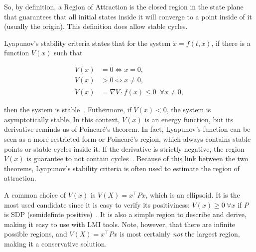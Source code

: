 So, by definition, a Region of Attraction is the closed region in the state
plane that guarantees that all initial states inside it will converge to a point
inside of it (usually the origin). This definition does allow stable cycles.

Lyapunov's stability criteria states that for the system \(\dot{x} = f(t, x)\),
if there is a function \(V(x)\) such that

\begin{align}
  V(x)       & = 0 \iff x = 0,                                           \\
  V(x)       & > 0 \iff x \ne 0,                                         \\
  \dot{V}(x) & = \nabla{}V\cdot{}f(x) \le 0 \phantom{0} \forall x \ne 0,
\end{align}

then the system is stable~\parencite{chen:linear,hespanha:linear}. Futhermore,
if \(\dot{V}(x)<0\), the system is asymptotically stable. In this context,
\(V(x)\) is an energy function, but its derivative reminds us of Poincaré's
theorem. In fact, Lyapunov's function can be seen as a more restricted form or
Poincaré's region, which always contains stable points or stable cycles inside
it. If the derivative is strictly negative, the region \(V(x)\) is guarantee to
not contain cycles~\parencite{chen:linear}. Because of this link between the two
theorems, Lyapunov's stability criteria is often used to estimate the region of
attraction.

A common choice of \(V(x)\) is \(V(X)=x^{\top}Px\), which is an ellipsoid. It is
the most used candidate since it is easy to verify its positiviness:
\(V(x)\ge{}0~\forall{}x\) if \(P\) is SDP (semidefinte
positive)~\parencite{bochnak.coste.ea:real}. It is also a simple region to
describe and derive, making it easy to use with LMI tools. Note, however, that
there are infinite possible regions, and \(V(X)=x^{\top}Px\) is most certainly
\textit{not} the largest region, making it a conservative solution.
